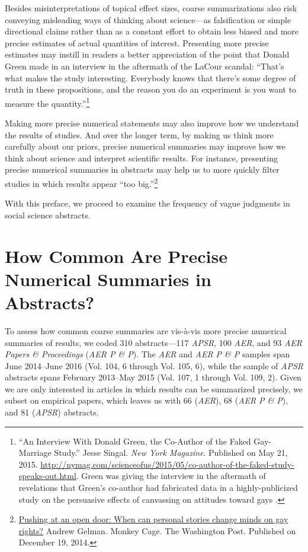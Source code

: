 \documentclass[12pt]{article}
\begin{document}
Besides misinterpretations of topical effect sizes, coarse summarizations also risk conveying misleading ways of thinking about science---as falsification or simple directional claims rather than as a constant effort to obtain less biased and more precise estimates of actual quantities of interest. Presenting more precise estimates may instill in readers a better appreciation of the point that Donald Green made in an interview in the aftermath of the LaCour scandal: ``That's what makes the study interesting. Everybody knows that there's some degree of truth in these propositions, and the reason you do an experiment is you want to measure the quantity.''\footnote{``An Interview With Donald Green, the Co-Author of the Faked Gay-Marriage Study.'' Jesse Singal. \emph{New York Magazine}. Published on May 21, 2015. \href{http://nymag.com/scienceofus/2015/05/co-author-of-the-faked-study-speaks-out.html}{http://nymag.com/scienceofus/2015/05/co-author-of-the-faked-study-speaks-out.html}. Green was giving the interview in the aftermath of revelations that Green's co-author had fabricated data in a highly-publicized study on the persuasive effects of canvassing on attitudes toward gays \citep{Broockman:2015, mcnutt2015editorial}.} 

Making more precise numerical statements may also improve how we understand the results of studies. And over the longer term, by making us think more carefully about our priors, precise numerical summaries may improve how we think about science and interpret scientific results. For instance, presenting precise numerical summaries in abstracts may help us to more quickly filter studies in which results appear ``too big.''\footnote{\href{http://www.washingtonpost.com/blogs/monkey-cage/wp/2014/12/19/pushing-at-an-open-door-when-can-personal-stories-change-minds-on-gay-rights/}{Pushing at an open door: When can personal stories change minds on gay rights?} Andrew Gelman. Monkey Cage. The Washington Post. Published on December 19, 2014.}

With this preface, we proceed to examine the frequency of vague judgments in social science abstracts. 

\section*{How Common Are Precise Numerical Summaries in Abstracts?}
\label{sec:sum}
To assess how common coarse summaries are vis-\`{a}-vis more precise numerical summaries of results, we coded 310 abstracts---117 \emph{APSR}, 100 \emph{AER}, and 93 \emph{AER Papers \& Proceedings} (\emph{AER P \& P}). The \emph{AER} and \emph{AER P \& P} samples span June 2014--June 2016 (Vol. 104, 6 through Vol. 105, 6), while the sample of \emph{APSR} abstracts spans February 2013--May 2015 (Vol. 107, 1 through Vol. 109, 2). Given we are only interested in articles in which results can be summarized precisely, we subset on empirical papers, which leaves us with 66 (\emph{AER}), 68 (\emph{AER} \emph{P \& P}), and 81 (\emph{APSR}) abstracts. 
\end{document}
